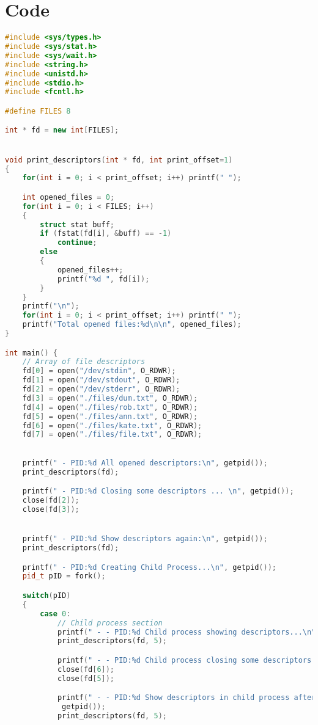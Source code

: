 \documentclass{article}
\begin{document}
\section*{Code}
\begin{lstlisting}[language=C++]
#include <sys/types.h>
#include <sys/stat.h>
#include <sys/wait.h>
#include <string.h>
#include <unistd.h>
#include <stdio.h>
#include <fcntl.h>

#define FILES 8

int * fd = new int[FILES];


void print_descriptors(int * fd, int print_offset=1)
{
    for(int i = 0; i < print_offset; i++) printf(" ");

    int opened_files = 0;
    for(int i = 0; i < FILES; i++)
    {
        struct stat buff;
        if (fstat(fd[i], &buff) == -1)
            continue;
        else
        {
            opened_files++;
            printf("%d ", fd[i]);
        }
    }
    printf("\n");
    for(int i = 0; i < print_offset; i++) printf(" ");
    printf("Total opened files:%d\n\n", opened_files);
}

int main() {
    // Array of file descriptors
    fd[0] = open("/dev/stdin", O_RDWR); 
    fd[1] = open("/dev/stdout", O_RDWR); 
    fd[2] = open("/dev/stderr", O_RDWR); 
    fd[3] = open("./files/dum.txt", O_RDWR); 
    fd[4] = open("./files/rob.txt", O_RDWR); 
    fd[5] = open("./files/ann.txt", O_RDWR); 
    fd[6] = open("./files/kate.txt", O_RDWR); 
    fd[7] = open("./files/file.txt", O_RDWR); 
    

    printf(" - PID:%d All opened descriptors:\n", getpid());
    print_descriptors(fd);

    printf(" - PID:%d Closing some descriptors ... \n", getpid());
    close(fd[2]);
    close(fd[3]);


    printf(" - PID:%d Show descriptors again:\n", getpid());
    print_descriptors(fd);

    printf(" - PID:%d Creating Child Process...\n", getpid());
    pid_t pID = fork();

    switch(pID)
    {
        case 0:
            // Child process section
            printf(" - - PID:%d Child process showing descriptors...\n", getpid());
            print_descriptors(fd, 5);  

            printf(" - - PID:%d Child process closing some descriptors...\n", getpid());
            close(fd[6]);
            close(fd[5]);

            printf(" - - PID:%d Show descriptors in child process after closing:\n",
             getpid());
            print_descriptors(fd, 5);


\end{lstlisting}
\end{document}
